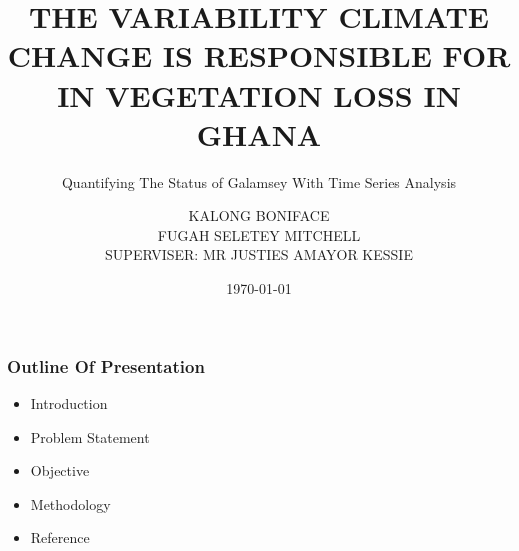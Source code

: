 \documentclass[11pt]{beamer}
\begin{document}
	\author[Group Nine]{KALONG BONIFACE \\
		   FUGAH SELETEY MITCHELL\\
		  			  SUPERVISER: MR JUSTIES AMAYOR KESSIE	}  
\title[Proposal]{THE VARIABILITY CLIMATE CHANGE IS RESPONSIBLE FOR IN VEGETATION LOSS IN GHANA}
	\subtitle{Quantifying The Status of Galamsey With Time Series Analysis}
	\date{\today}
	\begin{frame}
		\maketitle
	\end{frame}
	\begin{frame}
		\frametitle{Outline Of Presentation}
		\begin{itemize}
			\item Introduction
			\item Problem Statement
			\item Objective
			\item Methodology
			\item Reference
		\end{itemize}
	\end{frame}
\end{document}
